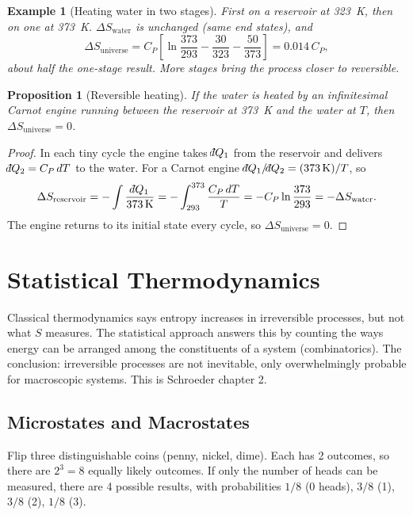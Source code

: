 \documentclass{article}
\newtheorem*{example}{Example}
\newtheorem{proposition}{Proposition}
\newcommand{\dbar}{\mathchar'26\mkern-12mu d}
\begin{document}
\begin{example}[Heating water in two stages]
    First on a reservoir at \SI{323}{\kelvin}, then on one at \SI{373}{\kelvin}. $\Delta S_{\text{water}}$ is unchanged (same end states), and
    \[\Delta S_{\text{universe}} = C_P\left[\ln\frac{373}{293} - \frac{30}{323} - \frac{50}{373}\right] = 0.014\,C_P,\]
    about half the one-stage result. More stages bring the process closer to reversible.
\end{example}

\begin{proposition}[Reversible heating]
    If the water is heated by an infinitesimal Carnot engine running between the reservoir at \SI{373}{\kelvin} and the water at $T$, then $\Delta S_{\text{universe}} = 0$.
\end{proposition}
\begin{proof}
    In each tiny cycle the engine takes $\dbar Q_1$ from the reservoir and delivers $\dbar Q_2 = C_P\,dT$ to the water. For a Carnot engine $\dbar Q_1/\dbar Q_2 = (\SI{373}{\kelvin})/T$, so
    \[\Delta S_{\text{reservoir}} = -\int \frac{\dbar Q_1}{\SI{373}{\kelvin}} = -\int_{293}^{373} \frac{C_P\,dT}{T} = -C_P \ln\frac{373}{293} = -\Delta S_{\text{water}}.\]
    The engine returns to its initial state every cycle, so $\Delta S_{\text{universe}} = 0$.
\end{proof}

\section{Statistical Thermodynamics}
Classical thermodynamics says entropy increases in irreversible processes, but not what $S$ measures. The statistical approach answers this by counting the ways energy can be arranged among the constituents of a system (combinatorics). The conclusion: irreversible processes are not inevitable, only overwhelmingly probable for macroscopic systems. This is Schroeder chapter 2.

\subsection{Microstates and Macrostates}
Flip three distinguishable coins (penny, nickel, dime). Each has 2 outcomes, so there are $2^3 = 8$ equally likely outcomes. If only the number of heads can be measured, there are 4 possible results, with probabilities $1/8$ (0 heads), $3/8$ (1), $3/8$ (2), $1/8$ (3).
\end{document}

